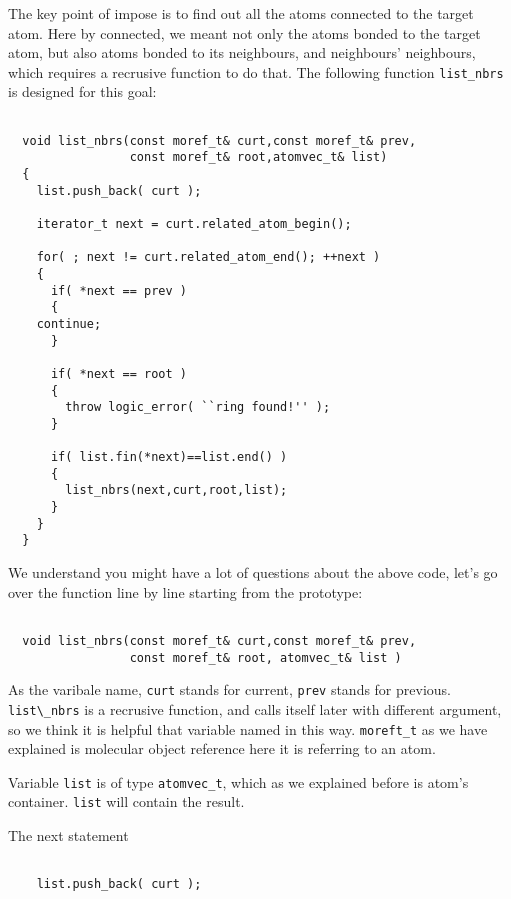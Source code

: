 \documentclass[letterpaper]{book}
\begin{document}
  The key point of impose is to find out all the atoms connected to the target atom. Here by
connected, we meant not only the atoms bonded to the target atom, but also atoms bonded to its 
neighbours, and neighbours' neighbours, which requires a recrusive function to do that. The 
following function \lstinline$list_nbrs$ is designed for this goal:

\begin{lstlisting}

  void list_nbrs(const moref_t& curt,const moref_t& prev, 
                 const moref_t& root,atomvec_t& list)
  {
    list.push_back( curt );

    iterator_t next = curt.related_atom_begin();

    for( ; next != curt.related_atom_end(); ++next )
    {
      if( *next == prev )
      {
	continue;
      }

      if( *next == root )
      {
        throw logic_error( ``ring found!'' );
      } 

      if( list.fin(*next)==list.end() )
      {
        list_nbrs(next,curt,root,list);
      }
    }
  }

\end{lstlisting}

We understand you might have a lot of questions about the above code, let's go over the
function line by line starting from the prototype:

\begin{lstlisting}

  void list_nbrs(const moref_t& curt,const moref_t& prev, 
                 const moref_t& root, atomvec_t& list )

\end{lstlisting}

As the varibale name, \lstinline$curt$ stands for current, \lstinline$prev$ stands for previous. \lstinline$list\_nbrs$
is a recrusive function, and calls itself later with different argument, so we think it is 
helpful that variable named in this way. \lstinline$moreft_t$ as we have explained is molecular
object reference here it is referring to an atom.

Variable \lstinline$list$ is  of type \lstinline$atomvec_t$, which as we explained before is atom's container. \lstinline$list$
will contain the result.

The next statement

\begin{lstlisting}

    list.push_back( curt );

\end{lstlisting}
\end{document}

